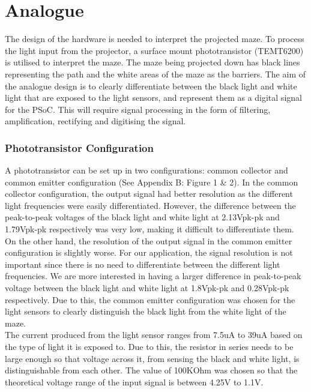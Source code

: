 \section{Analogue}

The design of the hardware is needed to interpret the projected maze.  To process the light input from the projector, a surface mount phototransistor (TEMT6200) is utilised to interpret the maze. The maze being projected down has black lines representing the path and the white areas of the maze as the barriers. The aim of the analogue design is to clearly differentiate between the black light and white light that are exposed to the light sensors, and represent them as a digital signal for the PSoC. This will require signal processing in the form of filtering, amplification, rectifying and digitising the signal.

\subsubsection*{Phototransistor Configuration}
A phototransistor can be set up in two configurations: common collector and common emitter configuration (See Appendix B: Figure 1 \& 2). In the common collector configuration, the output signal had better resolution as the different light frequencies were easily differentiated. However, the difference between the peak-to-peak voltages of the black light and white light at 2.13Vpk-pk and 1.79Vpk-pk respectively was very low, making it difficult to differentiate them. On the other hand, the resolution of the output signal in the common emitter configuration is slightly worse. For our application, the signal resolution is not important since there is no need to differentiate between the different light frequencies. We are more interested in having a larger difference in peak-to-peak voltage between the black light and white light at 1.8Vpk-pk and 0.28Vpk-pk respectively. Due to this, the common emitter configuration was chosen for the light sensors to clearly distinguish the black light from the white light of the maze. 
\\The current produced from the light sensor ranges from 7.5uA to 39uA based on the type of light it is exposed to. Due to this, the resistor in series needs to be large enough so that voltage across it, from sensing the black and white light, is distinguishable from each other. The value of 100KOhm was chosen so that the theoretical voltage range of the input signal is between 4.25V to 1.1V.

